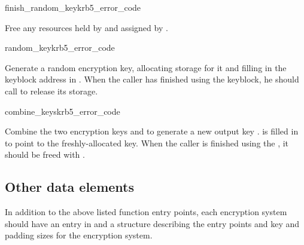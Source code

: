 \begin{funcdecl}{finish_random_key}{krb5_error_code}{\funcvoid}
\end{funcdecl}
Free any resources held by  and assigned by
. 

\begin{funcdecl}{random_key}{krb5_error_code}{\funcvoid}
\end{funcdecl}
Generate a random encryption key, allocating storage for it and
filling in the keyblock address in .
When the caller has finished using the keyblock, he should call
 to release its storage.

\begin{funcdecl}{combine_keys}{krb5_error_code}{\funcin}
\funcout
{}
\end{funcdecl}
Combine the two encryption keys  and  to
generate a new output key .   is
filled in to point to the freshly-allocated key.  When the caller is
finished using the , it should be freed with
.

\subsection{Other data elements}
In addition to the above listed function entry points, each encryption
system should have an entry in  and a
 structure describing the entry points
and key and padding sizes for the encryption system.
